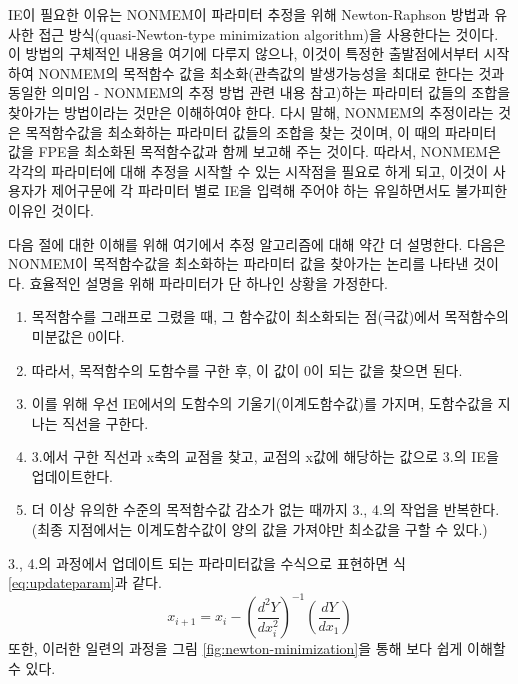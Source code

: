 \documentclass[
  10pt,
  krantz2,
  a4paper]{krantz}
\providecommand{\tightlist}{%
  \setlength{\itemsep}{0pt}\setlength{\parskip}{0pt}}
\theoremstyle{definition}
\theoremstyle{definition}
\theoremstyle{definition}
\theoremstyle{remark}
\begin{document}
IE이 필요한 이유는 NONMEM이 파라미터 추정을 위해 Newton-Raphson 방법과 유사한 접근 방식(quasi-Newton-type minimization algorithm)을 사용한다는 것이다. 이 방법의 구체적인 내용을 여기에 다루지 않으나, 이것이 특정한 출발점에서부터 시작하여 NONMEM의 목적함수 값을 최소화(관측값의 발생가능성을 최대로 한다는 것과 동일한 의미임 - NONMEM의 추정 방법 관련 내용 참고)하는 파라미터 값들의 조합을 찾아가는 방법이라는 것만은 이해하여야 한다. 다시 말해, NONMEM의 추정이라는 것은 목적함수값을 최소화하는 파라미터 값들의 조합을 찾는 것이며, 이 때의 파라미터 값을 FPE을 최소화된 목적함수값과 함께 보고해 주는 것이다. 따라서, NONMEM은 각각의 파라미터에 대해 추정을 시작할 수 있는 시작점을 필요로 하게 되고, 이것이 사용자가 제어구문에 각 파라미터 별로 IE을 입력해 주어야 하는 유일하면서도 불가피한 이유인 것이다.

다음 절에 대한 이해를 위해 여기에서 추정 알고리즘에 대해 약간 더 설명한다. 다음은 NONMEM이 목적함수값을 최소화하는 파라미터 값을 찾아가는 논리를 나타낸 것이다. 효율적인 설명을 위해 파라미터가 단 하나인 상황을 가정한다.

\begin{enumerate}
\def\labelenumi{\arabic{enumi}.}
\tightlist
\item
  목적함수를 그래프로 그렸을 때, 그 함수값이 최소화되는 점(극값)에서 목적함수의 미분값은 0이다. 
\item
  따라서, 목적함수의 도함수를 구한 후, 이 값이 0이 되는 값을 찾으면 된다. 
\item
  이를 위해 우선 IE에서의 도함수의 기울기(이계도함수값)를 가지며, 도함수값을 지나는 직선을 구한다. 
\item
  3.에서 구한 직선과 x축의 교점을 찾고, 교점의 x값에 해당하는 값으로 3.의 IE을 업데이트한다.
\item
  더 이상 유의한 수준의 목적함수값 감소가 없는 때까지 3., 4.의 작업을 반복한다. (최종 지점에서는 이계도함수값이 양의 값을 가져야만 최소값을 구할 수 있다.)
\end{enumerate}

3., 4.의 과정에서 업데이트 되는 파라미터값을 수식으로 표현하면 식 \eqref{eq:updateparam}과 같다.
\begin{equation}
x_{i+1} = x_i - (\frac{d^2Y}{dx_i^2})^{-1}(\frac{dY}{dx_1})
\label{eq:updateparam}
\end{equation}
또한, 이러한 일련의 과정을 그림 \ref{fig:newton-minimization}을 통해 보다 쉽게 이해할 수 있다.
\end{document}
